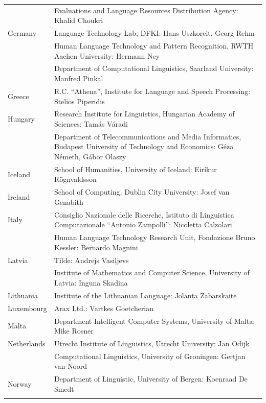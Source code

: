 \begin{longtable}{@{}lp{137mm}@{}}
& Evaluations and Language Resources Distribution Agency: Khalid Choukri\\ \addlinespace 
Germany & Language Technology Lab, DFKI: Hans Uszkoreit, Georg Rehm\\ \addlinespace 
& Human Language Technology and Pattern Recognition, RWTH Aachen University: Hermann Ney \\ \addlinespace 
& Department of Computational Linguistics, Saarland University: Manfred Pinkal\\ \addlinespace 
Greece & R.C. “Athena”, Institute for Language and Speech Processing: Stelios Piperidis\\ \addlinespace
Hungary & Research Institute for Linguistics, Hungarian Academy of Sciences: Tamás Váradi\\  \addlinespace
& Department of Telecommunications and Media Informatics, Budapest University of Technology and Economics: Géza Németh, Gábor Olaszy\\ \addlinespace
Iceland & School of Humanities, University of Iceland: Eiríkur Rögnvaldsson\\ \addlinespace
Ireland & School of Computing, Dublin City University: Josef van Genabith\\ \addlinespace
Italy & Consiglio Nazionale delle Ricerche, Istituto di Linguistica Computazionale “Antonio Zampolli”: \newline Nicoletta Calzolari\\ \addlinespace
& Human Language Technology Research Unit, Fondazione Bruno Kessler:  Bernardo Magnini\\ \addlinespace 
Latvia & Tilde: Andrejs Vasiļjevs\\ \addlinespace  
& Institute of Mathematics and Computer Science, University of Latvia: Inguna Skadiņa\\ \addlinespace
Lithuania & Institute of the Lithuanian Language: Jolanta Zabarskaitė\\ \addlinespace
Luxembourg & Arax Ltd.: Vartkes Goetcherian\\ \addlinespace
Malta & Department Intelligent Computer Systems, University of Malta: Mike Rosner\\ \addlinespace
Netherlands & Utrecht Institute of Linguistics, Utrecht University: Jan Odijk\\ \addlinespace  
& Computational Linguistics, University of Groningen: Gertjan van Noord\\ \addlinespace
Norway & Department of Linguistic, University of Bergen: Koenraad De Smedt\\ \addlinespace  

\end{longtable}
